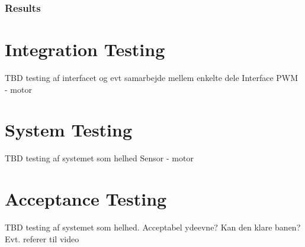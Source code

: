 \subsubsection{Results}


\section{Integration Testing}
TBD testing af interfacet og evt samarbejde mellem enkelte dele
Interface
PWM - motor

\section{System Testing}
TBD testing af systemet som helhed
Sensor - motor

\section{Acceptance Testing}
TBD testing af systemet som helhed. Acceptabel ydeevne?
Kan den klare banen? 
Evt. referer til video






